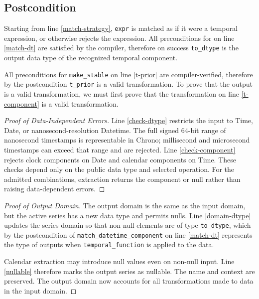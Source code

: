 \documentclass{article}
\begin{document}
\subsection*{Postcondition}
\begin{sloppypar}
\begin{theorem}
\end{theorem}
\end{sloppypar}
Starting from line \ref{match-strategy},
\texttt{expr} is matched as if it were a temporal expression, or otherwise rejects the expression.
All preconditions for 
on line \ref{match-dt} are satisfied by the compiler,
therefore on success \texttt{to\_dtype} is the output data type of the recognized temporal component.

All preconditions for \texttt{make\_stable} on line \ref{t-prior} are compiler-verified,
therefore by the postcondition \texttt{t\_prior} is a valid transformation.
To prove that the output is a valid transformation,
we must first prove that the transformation on line \ref{t-component} is a valid transformation.

\begin{proof}[Proof of Data-Independent Errors]
    Line \ref{check-dtype} restricts the input to Time, Date, or nanosecond-resolution Datetime.
    The full signed 64-bit range of nanosecond timestamps is representable in Chrono;
    millisecond and microsecond timestamps can exceed that range and are rejected.
    Line \ref{check-component} rejects clock components on Date and calendar components on Time.
    These checks depend only on the public data type and selected operation.
    For the admitted combinations, extraction returns the component or null rather than raising data-dependent errors.
\end{proof}

\begin{proof}[Proof of Output Domain]
    The output domain is the same as the input domain,
    but the active series has a new data type and permits nulls.
    Line \ref{domain-dtype} updates the series domain so that non-null elements are of type \texttt{to\_dtype},
    which by the postcondition of \texttt{match\_datetime\_component} on line \ref{match-dt}
    represents the type of outputs when \texttt{temporal\_function} is applied to the data.

    Calendar extraction may introduce null values even on non-null input.
    Line \ref{nullable} therefore marks the output series as nullable.
    The name and context are preserved.
    The output domain now accounts for all transformations made to data in the input domain.
\end{proof}
\end{document}
